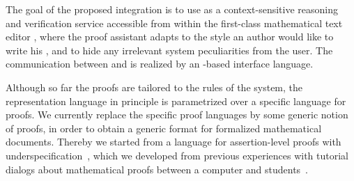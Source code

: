 \begin{omgroup}[id=texmacs-omega,short=Proof Assistants in Scientific Editors,
  creators={autexier,benzmueller,fiedler,lesourd}]
The goal of the proposed integration is to use {\OMEGA} as a context-sensitive reasoning
and verification service accessible from within the first-class mathematical text editor
{\texmacs}, where the proof assistant adapts to the style an author would like to write
his {}, and to hide any irrelevant system peculiarities
from the user.  The communication between {\texmacs} and {\OMEGA} is realized by an
{\omdoc}-based interface language.

Although so far the proofs are tailored to the rules of the {\CORE} system, the
representation language in principle is parametrized over a specific language for proofs.
We currently replace the {\CORE} specific proof languages by some generic notion of
proofs, in order to obtain a generic format for formalized mathematical documents.
Thereby we started from a language for assertion-level proofs with
underspecification~\cite{mkmlanguage,AF-05-a}, which we developed from previous
experiences with tutorial dialogs about mathematical proofs between a computer and
students~\cite{dialog}.  
\end{omgroup}

